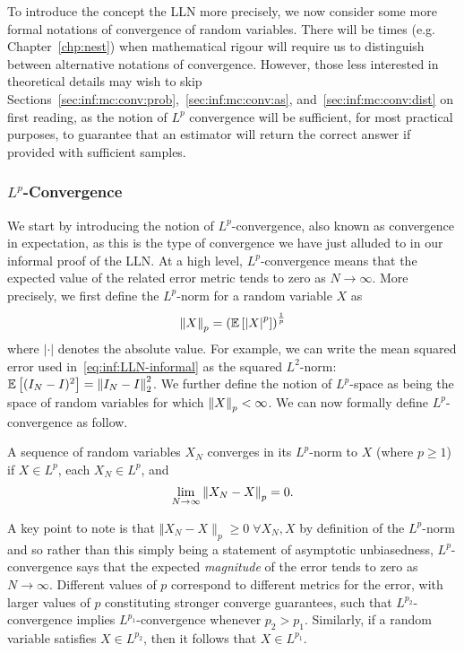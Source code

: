 To introduce the concept the LLN more precisely, we now consider some more formal notations
of convergence of random variables.  There will be times (e.g. Chapter~\ref{chp:nest})
when mathematical rigour will require us to distinguish between alternative notations of convergence.
However, those less interested in theoretical details may wish to
skip Sections~\ref{sec:inf:mc:conv:prob},~\ref{sec:inf:mc:conv:as}, and~\ref{sec:inf:mc:conv:dist}
on first reading, as the notion of $L^p$ convergence will be sufficient, for most practical purposes,
to guarantee that an estimator will return the correct answer if provided 
with sufficient samples. 

\subsubsection{$L^p$-Convergence}
\label{sec:inf:mc:conv:Lr}

We start by introducing the notion of $L^p$-convergence, also known as convergence in expectation,
as this is the type of convergence we have just alluded to in our informal proof of the LLN.
At a high level, $L^p$-convergence means that the expected value of the related error metric
tends to zero as $N\rightarrow \infty$.  More precisely, we first define the $L^p$-norm for
a random variable $X$ as
\begin{align}
\label{eq:inf:Lp-norm}
\left\lVert X\right\rVert_p = \left(\mathbb{E} \left[\left|X\right|^{p}\right]\right)^{\frac{1}{p}}
\end{align}
where $\left|\cdot\right|$ denotes the absolute value.  For example, we can write the
mean squared error used in~\eqref{eq:inf:LLN-informal} as the squared $L^2$-norm:
$\mathbb{E} \left[(I_N-I)^2\right] = \left\lVert I_N-I\right\rVert_2^2$.  We further define the notion of $L^p$-space
as being the space of random variables for which $\left\lVert X\right\rVert_p < \infty$.  We can now
formally define $L^p$-convergence as follow.
\begin{definition}[$L^p$-convergence]
A sequence of random variables $X_N$ converges in its $L^p$-norm to 
$X$ (where $p\ge1$) if $X\in L^p$, each $X_N \in L^p$, and
\begin{align}
\lim\limits_{N\rightarrow\infty} \left\lVert X_N-X\right\rVert_p=0. \label{eq:inf:Lp-conv-formal}
\end{align}
\end{definition}
\noindent A key point to note is that $\Vert X_N-X\rVert_p\ge0 \; \forall X_N, X$ by definition of the $L^p$-norm and so
rather than this simply being a statement of asymptotic unbiasedness, $L^p$-convergence says that the expected
\emph{magnitude} of the error tends to zero as $N\rightarrow\infty$.
Different values of $p$ correspond to different metrics for the error, with larger values of
$p$ constituting stronger converge guarantees, such that $L^{p_2}$-convergence implies
$L^{p_1}$-convergence whenever $p_2>p_1$.  Similarly, if a random variable satisfies
$X \in L^{p_2}$, then it follows that $X \in L^{p_1}$.

